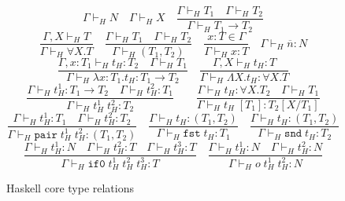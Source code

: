 \begin{figure}
\[
\Gamma\vdash_{H}N
\quad
\Gamma\vdash_{H}X
\quad
\frac{\Gamma\vdash_{H}T_{1}\quad\Gamma\vdash_{H}T_{2}}{\Gamma\vdash_{H}T_{1}\rightarrow T_{2}}
\]
\[
\frac{\Gamma ,X\vdash_{H}T}{\Gamma\vdash_{H}\forall X.T}
\quad
\frac{\Gamma\vdash_{H}T_{1}\quad\Gamma\vdash_{H}T_{2}}{\Gamma\vdash_{H}(T_{1},T_{2})}
\quad
\frac{x:T\in\Gamma}{\Gamma\vdash_{H}x:T}
\quad
\Gamma\vdash_{H}\overline{n}:N
\]
\[
\frac{\Gamma,x:T_{1}\vdash_{H}t_{H}:T_{2}\quad\Gamma\vdash_{H}T_{1}}{\Gamma\vdash_{H}\lambda x:T_{1}.t_{H}:T_{1}\rightarrow T_{2}}
\quad
\frac{\Gamma,X\vdash_{H}t_{H}:T}{\Gamma\vdash_{H}\Lambda X.t_{H}:\forall X.T}
\]
\[
\frac{\Gamma\vdash_{H}t_{H}^{1}:T_{1}\rightarrow T_{2}\quad\Gamma\vdash_{H}t_{H}^{2}:T_{1}}{\Gamma\vdash_{H}t_{H}^{1}\;t_{H}^{2}:T_{2}}
\quad
\quad
\frac{\Gamma\vdash_{H}t_{H}:\forall X.T_{2}\quad\Gamma\vdash_{H}T_{1}}{\Gamma\vdash_{H}t_{H}\;[T_{1}]:T_{2}[X/T_{1}]}
\]
\[
\frac{\Gamma\vdash_{H}t_{H}^{1}:T_{1}\quad\Gamma\vdash_{H}t_{H}^{2}:T_{2}}{\Gamma\vdash_{H}\mathtt{pair}\;t_{H}^{1}\;t_{H}^{2}:(T_{1},T_{2})}
\quad
\frac{\Gamma\vdash_{H}t_{H}:(T_{1},T_{2})}{\Gamma\vdash_{H}\mathtt{fst}\;t_{H}:T_{1}}
\quad
\frac{\Gamma\vdash_{H}t_{H}:(T_{1},T_{2})}{\Gamma\vdash_{H}\mathtt{snd}\;t_{H}:T_{2}}
\]
\[
\frac{\Gamma\vdash_{H}t_{H}^{1}:N\quad\Gamma\vdash_{H}t_{H}^{2}:T\quad\Gamma\vdash_{H}t_{H}^{3}:T}{\Gamma\vdash_{H}\mathtt{if0}\;t_{H}^{1}\;t_{H}^{2}\;t_{H}^{3}:T}
\quad
\frac{\Gamma\vdash_{H}t_{H}^{1}:N\quad\Gamma\vdash_{H}t_{H}^{2}:N}{\Gamma\vdash_{H}o\;t_{H}^{1}\;t_{H}^{2}:N}
\]
\caption{Haskell core type relations}
\label{hctr}
\end{figure}
